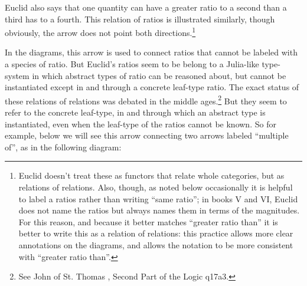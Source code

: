 \documentclass[11pt]{article}
\newcommand{\flushleftright}{\noindent\justifying}
\begin{document}
\flushleftright%
Euclid also says that one quantity can have a greater ratio to a second than a third has to a fourth. This relation of ratios is illustrated similarly, though obviously, the arrow does not point both directions.\footnote{Euclid doesn't treat these as functors that relate whole categories, but as relations of relations. Also, though, as noted below occasionally it is helpful to label a ratios rather than writing ``same ratio''; in books V and VI, Euclid does not name the ratios but always names them in terms of the magnitudes. For this reason, and because it better matches ``greater ratio than'' it is better to write this as a relation of relations: this practice allows more clear annotations on the diagrams, and allows the notation to be more consistent with ``greater ratio than''.}

In the diagrams, this arrow is used to connect ratios that cannot be labeled with a species of ratio. But Euclid's ratios seem to be belong to a Julia-like \citep{juliatypes2026} type-system in which abstract types of ratio can be reasoned about, but cannot be instantiated except in and through a concrete leaf-type ratio. The exact status of these relations of relations was debated in the middle ages.\footnote{See John of St. Thomas  \protect\citep{johnofstthomas1985}, Second Part of the Logic q17a3.} But they seem to refer to the concrete leaf-type, in and through which an abstract type is instantiated, even when the leaf-type of the ratios cannot be known. So for example, below we will see this arrow connecting two arrows labeled ``multiple of'', as in the following diagram:

\centering
{}
\end{document}
